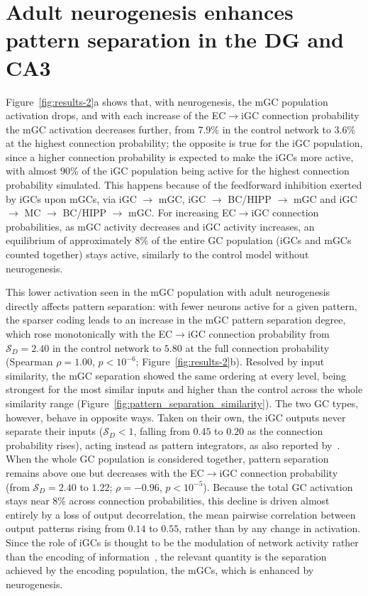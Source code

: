 \section{Adult neurogenesis enhances pattern separation in the DG and CA3}\label{sec:res_separation}

Figure~\ref{fig:results-2}a shows that, with neurogenesis, the mGC population activation drops, and with each increase of the
EC$\to$iGC connection probability the mGC activation decreases further, from 7.9\% in the control network to 3.6\% at the highest
connection probability; the opposite is true for the iGC population, since a higher connection probability is expected to make the
iGCs more active, with almost 90\% of the iGC population being active for the highest connection probability simulated. This
happens because of the feedforward inhibition exerted by iGCs upon mGCs, via iGC $\to$ mGC, iGC $\to$ BC/HIPP $\to$ mGC and iGC
$\to$ MC $\to$ BC/HIPP $\to$ mGC\@. For increasing EC$\to$iGC connection probabilities, as mGC activity decreases and iGC activity
increases, an equilibrium of approximately 8\% of the entire GC population (iGCs and mGCs counted together) stays active,
similarly to the control model without neurogenesis.

This lower activation seen in the mGC population with adult neurogenesis directly affects pattern separation: with fewer neurons
active for a given pattern, the sparser coding leads to an increase in the mGC pattern separation degree, which rose monotonically
with the EC$\to$iGC connection probability from $\mathcal{S}_D = 2.40$ in the control network to $5.80$ at the full connection
probability (Spearman $\rho = 1.00$, $p < 10^{-6}$; Figure~\ref{fig:results-2}b). Resolved by input similarity, the mGC separation
showed the same ordering at every level, being strongest for the most similar inputs and higher than the control across the whole
similarity range (Figure~\ref{fig:pattern_separation_similarity}). The two GC types, however, behave in opposite ways. Taken on
their own, the iGC outputs never separate their inputs ($\mathcal{S}_D < 1$, falling from $0.45$ to $0.20$ as the connection
probability rises), acting instead as pattern integrators, as also reported by~\textcite{kimEffect2024}. When the whole GC
population is considered together, pattern separation remains above one but decreases with the EC$\to$iGC connection probability
(from $\mathcal{S}_D = 2.40$ to $1.22$; $\rho = -0.96$, $p < 10^{-5}$). Because the total GC activation stays near 8\% across
connection probabilities, this decline is driven almost entirely by a loss of output decorrelation, the mean pairwise correlation
between output patterns rising from $0.14$ to $0.55$, rather than by any change in activation. Since the role of iGCs is thought
to be the modulation of network activity rather than the encoding of information~\parencite{mchughAdultborn2022,
folszAdultborn2023}, the relevant quantity is the separation achieved by the encoding population, the mGCs, which is enhanced by
neurogenesis.

